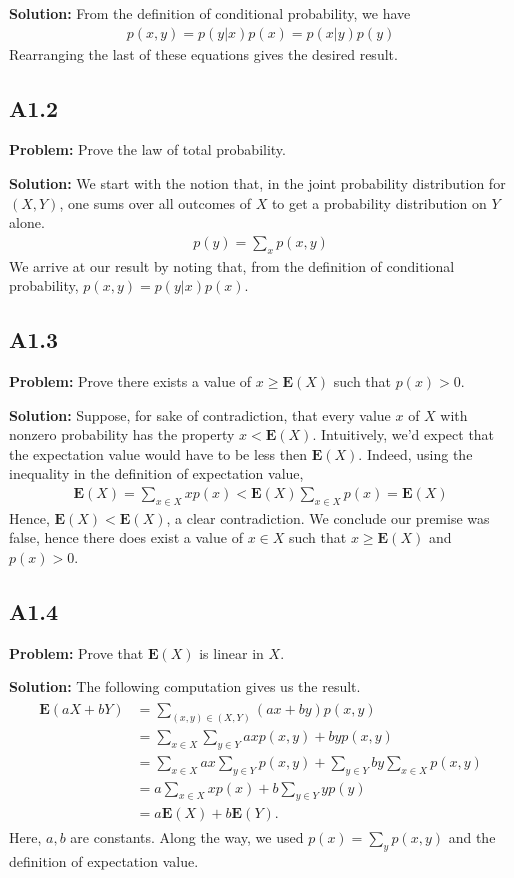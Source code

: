 \documentclass{article}
\begin{document}
\textbf{Solution:} From the definition of conditional probability, we have
\begin{align}
    p(x,y) = p(y|x)p(x) = p(x|y)p(y)
\end{align}
Rearranging the last of these equations gives the desired result.

\subsection*{A1.2}
\textbf{Problem:} Prove the law of total probability.

\textbf{Solution:} We start with the notion that, in the joint probability distribution for $(X,Y)$, one sums over all outcomes of $X$ to get a probability distribution on $Y$ alone.
\begin{align}
    p(y) = \sum_x p(x,y)
\end{align}
We arrive at our result by noting that, from the definition of conditional probability, $p(x,y) = p(y|x)p(x)$.

\subsection*{A1.3}
\textbf{Problem:} Prove there exists a value of $x\geq\textbf{E}(X)$ such that $p(x)>0$.

\textbf{Solution:} Suppose, for sake of contradiction, that every value $x$ of $X$ with nonzero probability has the property $x < \textbf{E}(X)$. Intuitively, we'd expect that the expectation value would have to be less then $\textbf{E}(X)$. Indeed, using the inequality in the definition of expectation value,
\begin{align}
    \textbf{E}(X) = \sum_{x\in X} x p(x) < \textbf{E}(X)\sum_{x\in X}p(x) = \textbf{E}(X)
\end{align}
Hence, $\textbf{E}(X)<\textbf{E}(X)$, a clear contradiction. We conclude our premise was false, hence there does exist a value of $x\in X$ such that $x \geq \textbf{E}(X)$ and $p(x)>0$.

\subsection*{A1.4} 
\textbf{Problem:} Prove that $\textbf{E}(X)$ is linear in $X$.

\textbf{Solution:} The following computation gives us the result.
\begin{align}
\begin{aligned}
    \textbf{E}(aX+bY) &= \sum_{(x,y)\in(X,Y)}(ax+by)p(x,y) \\
    &= \sum_{x\in X}\sum_{y\in Y}axp(x,y) + byp(x,y) \\
    &=\sum_{x\in X}ax\sum_{y\in Y}p(x,y) + \sum_{y\in Y}by\sum_{x\in X}p(x,y) \\
    &=a\sum_{x\in X}x p(x) + b\sum_{y\in Y}yp(y) \\
    &=a\textbf{E}(X) + b\textbf{E}(Y).
\end{aligned}
\end{align}
Here, $a,b$ are constants. Along the way, we used $p(x) = \sum_y p(x,y)$ and the definition of expectation value.
\end{document}
